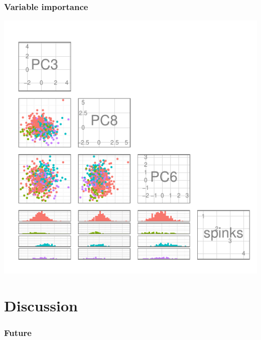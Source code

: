 \documentclass{beamer}\usepackage{graphicx, color}
\makeatletter
\def\maxwidth{ %
  \ifdim\Gin@nat@width>\linewidth
    \linewidth
  \else
    \Gin@nat@width
  \fi
}
\newenvironment{knitrout}{}{} %
\makeatother
\begin{document}
\begin{frame}[fragile]
  \frametitle{Variable importance}
\begin{knitrout}
\color{fgcolor}
\includegraphics[width=\maxwidth]{figure/imp} 

\end{knitrout}

\end{frame}


\section{Discussion}
\begin{frame}
  \frametitle{Future}
\end{frame}
\end{document}
